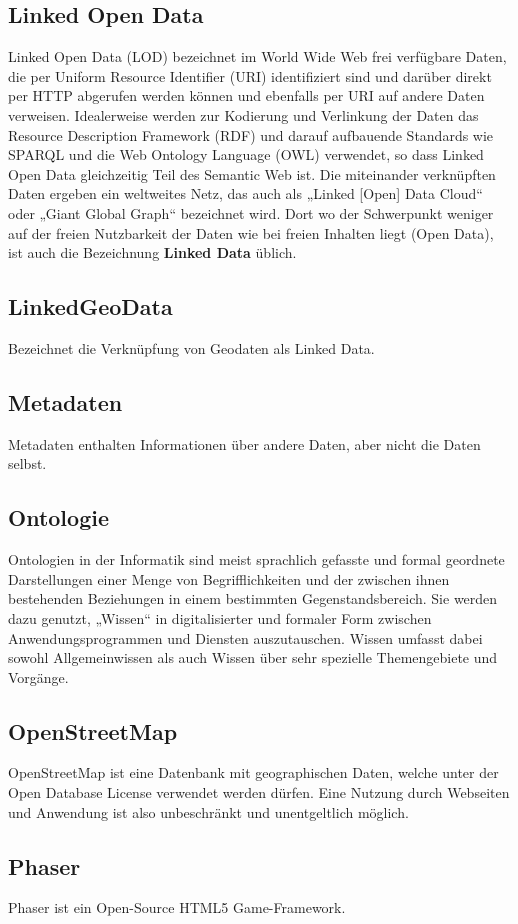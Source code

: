 \documentclass[11pt,a4paper]{article}
\begin{document}
\subsection{Linked Open Data}
Linked Open Data (LOD) bezeichnet im World Wide Web frei verfügbare Daten, die per Uniform Resource Identifier (URI) identifiziert sind und darüber direkt per HTTP abgerufen werden können und ebenfalls per URI auf andere Daten verweisen. Idealerweise werden zur Kodierung und Verlinkung der Daten das Resource Description Framework (RDF) und darauf aufbauende Standards wie SPARQL und die Web Ontology Language (OWL) verwendet, so dass Linked Open Data gleichzeitig Teil des Semantic Web ist. Die miteinander verknüpften Daten ergeben ein weltweites Netz, das auch als „Linked [Open] Data Cloud“ oder „Giant Global Graph“ bezeichnet wird. Dort wo der Schwerpunkt weniger auf der freien Nutzbarkeit der Daten wie bei freien Inhalten liegt (Open Data), ist auch die Bezeichnung \textbf{Linked Data} üblich.\subsection{LinkedGeoData}
Bezeichnet die Verknüpfung von Geodaten als Linked Data.
\subsection{Metadaten}
Metadaten enthalten Informationen über andere Daten, aber nicht die Daten selbst.
\subsection{Ontologie}
Ontologien in der Informatik  sind meist sprachlich gefasste und formal geordnete Darstellungen einer  Menge von Begrifflichkeiten und der zwischen ihnen bestehenden  Beziehungen in einem bestimmten Gegenstandsbereich. Sie werden dazu  genutzt, „Wissen“ in digitalisierter und formaler Form zwischen Anwendungsprogrammen  und Diensten auszutauschen. Wissen umfasst dabei sowohl Allgemeinwissen  als auch Wissen über sehr spezielle Themengebiete und Vorgänge.
\subsection{OpenStreetMap}
OpenStreetMap ist eine  Datenbank mit geographischen Daten, welche unter der Open Database License verwendet werden dürfen. Eine Nutzung durch Webseiten und  Anwendung ist also unbeschränkt und unentgeltlich möglich.
\subsection{Phaser}
Phaser ist ein Open-Source HTML5 Game-Framework.
\end{document}
